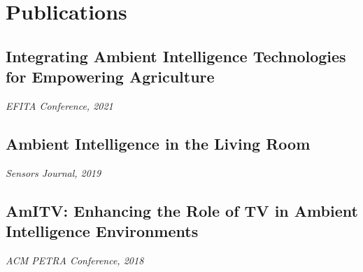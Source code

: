 \documentclass[a4paper,10pt]{article}
\begin{document}
\vspace{2pt}

\section*{ Publications}
\subsection*{Integrating Ambient Intelligence Technologies for Empowering Agriculture}
\textit{EFITA Conference, 2021}  

\subsection*{Ambient Intelligence in the Living Room}
\textit{Sensors Journal, 2019}  

\subsection*{AmITV: Enhancing the Role of TV in Ambient Intelligence Environments}
\textit{ACM PETRA Conference, 2018}  

\vspace{2pt}
\end{document}
